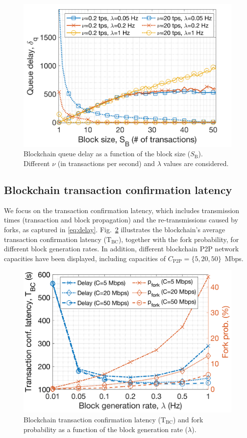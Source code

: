 \documentclass[lettersize,journal]{IEEEtran}
\begin{document}
\begin{figure}[ht!]
	\centering
	\includegraphics[width=.7\linewidth]{img/0_block_size_delay.png}
	\caption{Blockchain queue delay as a function of the block size ($S_\text{B}$). Different $\nu$ (in transactions per second) and $\lambda$ values are considered.}
	\label{fig:2_block_size_lambda02}
\end{figure}

\subsection{Blockchain transaction confirmation latency}

We focus on the transaction confirmation latency, which includes transmission times (transaction and block propagation) and the re-transmissions caused by forks, as captured in \eqref{eq:delay}. Fig.~\ref{fig:4_transaction_confirmation_delay} illustrates the blockchain's average transaction confirmation latency ($\text{T}_\text{BC}$), together with the fork probability, for different block generation rates. In addition, different blockchain P2P network capacities have been displayed, including capacities of $C_\text{P2P}=\{5, 20, 50\}$~Mbps.

\begin{figure}[ht!]
	\centering
	\includegraphics[width=.65\linewidth]{img/2_transaction_confirmation_delay_3.png}
	\caption{Blockchain transaction confirmation latency ($\text{T}_\text{BC}$) and fork probability as a function of the block generation rate ($\lambda$).}
	\label{fig:4_transaction_confirmation_delay}
\end{figure}
\end{document}
